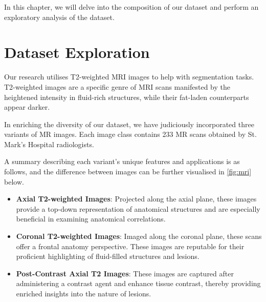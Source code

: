 In this chapter, we will delve into the composition of our dataset and perform an exploratory analysis of the dataset.

\section{Dataset Exploration}

Our research utilises T2-weighted MRI images to help with segmentation tasks. T2-weighted images are a specific genre of MRI scans manifested by the heightened intensity in fluid-rich structures, while their fat-laden counterparts appear darker.

In enriching the diversity of our dataset, we have judiciously incorporated three variants of MR images. Each image class contains 233 MR scans obtained by St. Mark's Hospital radiologists.

A summary describing each variant's unique features and applications is as follows, and the difference between images can be further visualised in \autoref{fig:mri} below.

\begin{itemize}
    \item \textbf{Axial T2-weighted Images}: Projected along the axial plane, these images provide a top-down representation of anatomical structures and are especially beneficial in examining anatomical correlations.
    \item \textbf{Coronal T2-weighted Images}: Imaged along the coronal plane, these scans offer a frontal anatomy perspective. These images are reputable for their proficient highlighting of fluid-filled structures and lesions.
    \item \textbf{Post-Contrast Axial T2 Images}: These images are captured after administering a contrast agent and enhance tissue contrast, thereby providing enriched insights into the nature of lesions.
\end{itemize}

